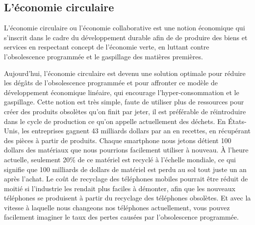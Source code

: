 \subsection{L'économie circulaire}



L’économie circulaire ou l’économie collaborative est une notion économique qui s'inscrit dans le cadre du développement durable afin de de produire des biens et services en respectant concept de l'économie verte, en luttant contre l'obsolescence programmée et le gaspillage des matières premières.

Aujourd'hui, l'économie circulaire est devenu une solution optimale pour réduire les dégâts de l'obsolescence programmée et pour affronter ce modèle de développement économique linéaire, qui encourage l’hyper-consommation et le gaspillage. Cette notion est très simple, faute de utiliser plus de ressources pour créer des produits obsolètes qu'on finit par jeter, il est préférable de réintroduire dans le cycle de production ce qu'on appelle actuellement des déchets.
En États-Unis, les entreprises gagnent 43 milliards dollars par an en recettes, en récupérant des pièces à partir de produits. Chaque smartphone nous jetons détient 100 dollars des matériaux que nous pourrions facilement utiliser à nouveau.     À l'heure actuelle, seulement 20\% de ce matériel est recyclé à l'échelle mondiale, ce qui signifie que 100 milliards de dollars de matériel est perdu au sol tout juste un an après l'achat. Le coût de recyclage des téléphones mobiles pourrait être réduit de moitié si l'industrie les rendait plus faciles à démonter, afin que les nouveaux téléphones se produisent à partir du recyclage des téléphones obsolètes. Et avec la vitesse à laquelle nous changeons nos téléphones actuellement, vous pouvez facilement imaginer le taux des pertes causées par l'obsolescence programmée.

